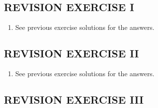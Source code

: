 \documentclass[a4paper,12pt]{article}
\begin{document}
    \subsection*{REVISION EXERCISE I}

    \begin{enumerate}[label=\arabic*,leftmargin=*]
        \item See previous exercise solutions for the answers.
    \end{enumerate}

    \subsection*{REVISION EXERCISE II}

    \begin{enumerate}[label=\arabic*,leftmargin=*]
        \item See previous exercise solutions for the answers.
    \end{enumerate}

    \subsection*{REVISION EXERCISE III}
\end{document}
